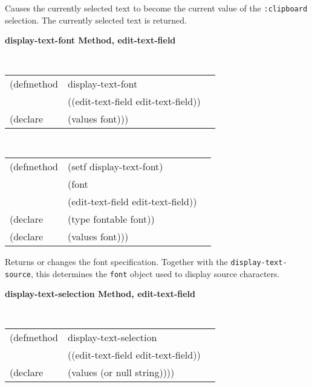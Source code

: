 \begin{flushright} \parbox[t]{6.125in}{
Causes the currently selected text to become the
current value of the {\tt :clipboard} selection. The currently selected text is returned. 

}\end{flushright}


{\samepage  
{\large {\bf display-text-font \hfill Method, edit-text-field}}
\begin{flushright} \parbox[t]{6.125in}{
\tt
\begin{tabular}{lll}
\raggedright
(defmethod & display-text-font & \\
& ((edit-text-field  edit-text-field)) \\
(declare & (values font)))
\end{tabular}
\rm

}\end{flushright}}

\begin{flushright} \parbox[t]{6.125in}{
\tt
\begin{tabular}{lll}
\raggedright
(defmethod & (setf display-text-font) & \\
         & (font \\
         & (edit-text-field  edit-text-field)) \\
(declare &(type fontable  font))\\
(declare & (values font)))
\end{tabular}
\rm}
\end{flushright}

\begin{flushright} \parbox[t]{6.125in}{
Returns or changes the font specification. Together
with the {\tt display-text-source}, this determines the {\tt font}
object used to display source characters.
}
\end{flushright}


{\samepage  
{\large {\bf display-text-selection \hfill Method, edit-text-field}}
\begin{flushright} \parbox[t]{6.125in}{
\tt
\begin{tabular}{lll}
\raggedright
(defmethod & display-text-selection & \\
& ((edit-text-field  edit-text-field)) \\
(declare & (values (or null string))))
\end{tabular}
\rm

}\end{flushright}}




